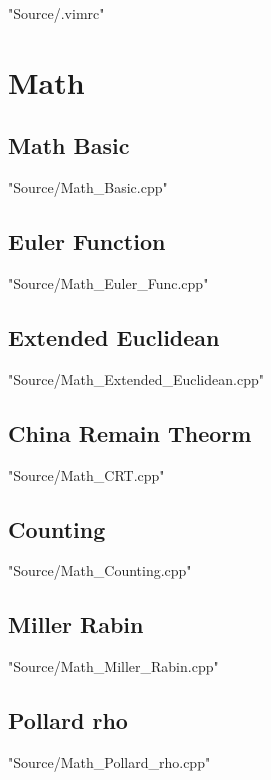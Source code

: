 \documentclass [12pt,twocolumn,oneside]{article}
\begin{document}
\pagestyle{fancy}
\fancyfoot{}
\fancyhead[R]{\thepage}
\setlength{\headheight}{15pt}
\renewcommand{\headrulewidth}{0.4pt}
\renewcommand{\contentsname}{Contents} 
\scriptsize
\tableofcontents

\bigskip
 {"Source/.vimrc"}




\newpage
\section{Math}
\subsection{Math Basic}
 {"Source/Math_Basic.cpp"}

\subsection{Euler Function}
 {"Source/Math_Euler_Func.cpp"}

\subsection{Extended Euclidean}
 {"Source/Math_Extended_Euclidean.cpp"}

\subsection{China Remain Theorm}
 {"Source/Math_CRT.cpp"}

\subsection{Counting}
 {"Source/Math_Counting.cpp"}

\subsection{Miller Rabin}
 {"Source/Math_Miller_Rabin.cpp"}

\subsection{Pollard rho}
 {"Source/Math_Pollard_rho.cpp"}
\end{document}
